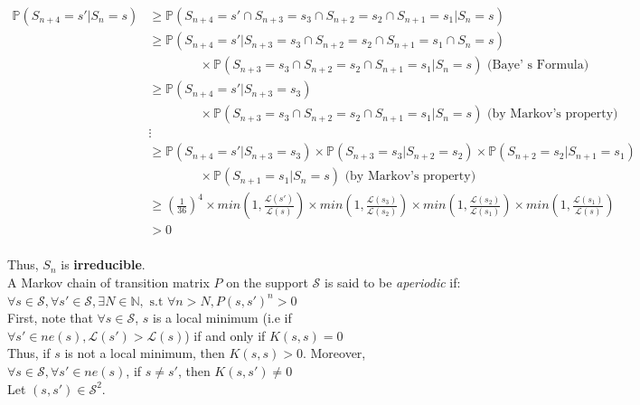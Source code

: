 $
\begin{aligned}
    \mathbb{P}(S_{n+4}=s'\vert S_n = s) & \geqslant \mathbb{P}(S_{n+4} = s' \cap  S_{n+3}= s_3 \cap S_{n+2} = s_2 \cap S_{n+1} = s_1 \vert S_n = s) \\
    & \geqslant \mathbb{P}(S_{n+4} = s' \vert S_{n+3} = s_3 \cap S_{n+2} = s_2 \cap S_{n+1} = s_1 \cap S_n = s) \\
    & \quad\quad\quad\quad \times \mathbb{P}(S_{n+3} = s_3 \cap S_{n+2} = s_2 \cap S_{n+1} = s_1 \vert S_n = s) \text{  (Baye' s Formula)}\\
    & \geqslant \mathbb{P}(S_{n+4} = s' \vert S_{n+3} = s_3)\\
    & \quad\quad\quad\quad  \times \mathbb{P}(S_{n+3} = s_3 \cap S_{n+2} = s_2 \cap S_{n+1} = s_1 \vert S_n = s)  \text{ (by Markov's property)}\\
    & \vdots \\
    & \geqslant \mathbb{P}(S_{n+4} = s' \vert S_{n+3} = s_3) \times \mathbb{P}(S_{n+3} = s_3 \vert S_{n+2} = s_2) \times \mathbb{P}(S_{n+2} = s_2 \vert S_{n+1} = s_1) \\
    & \quad\quad\quad\quad \times \mathbb{P}(S_{n+1} = s_1 \vert S_n = s) \text{ (by Markov's property)}\\
    & \geqslant (\frac{1}{36})^4 \times min (1, \frac{\mathcal{L}(s')}{\mathcal{L}(s)}) \times min (1, \frac{\mathcal{L}(s_3)}{\mathcal{L}(s_2)}) \times min (1, \frac{\mathcal{L}(s_2)}{\mathcal{L}(s_1)}) \times min (1, \frac{\mathcal{L}(s_1)}{\mathcal{L}(s)})  \\
    & > 0 \\
\end{aligned}
$

Thus, $S_n$ is \textbf{irreducible}.\\

A Markov chain of transition matrix $P$ on the support $\mathcal{S}$ is said to be \textit{aperiodic} if: \\
$\forall s \in \mathcal{S}, \forall s' \in \mathcal{S}, \exists N \in \mathbb{N}, \text{ s.t } \forall n > N, P(s, s')^n >0 $ \cite{bodineau2015modelisation}\\

First, note that $\forall s \in \mathcal{S}$,  $s$ is a local minimum (i.e if $\forall s' \in ne(s), \mathcal{L}(s') > \mathcal{L}(s) $) if and only if $K(s,s)=0$\\

Thus, if $s$ is not a local minimum, then $K(s, s)>0$. Moreover, $ \forall s \in \mathcal{S}, \forall s' \in ne(s)$, if $s\neq s'$, then $K(s, s') \neq 0 $\\[0.3cm]
Let $(s, s')  \in \mathcal{S}^2$. \\

